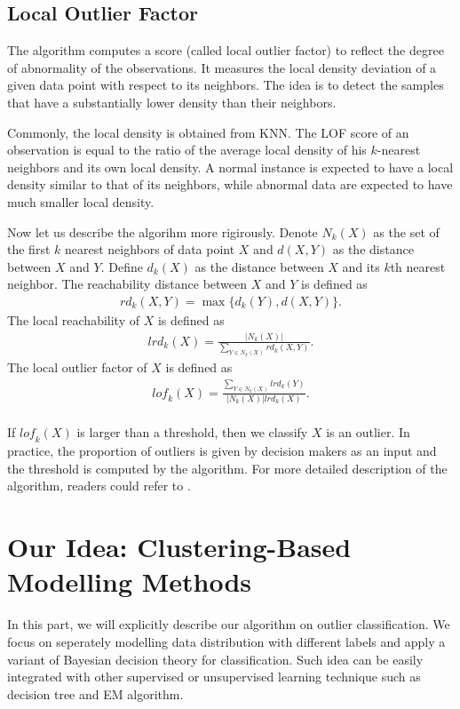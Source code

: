 \documentclass[english]{article}
\newenvironment{eqt}{\begin{equation}\begin{aligned}}{\end{aligned}\end{equation}}
\begin{document}
\subsection{Local Outlier Factor}
\par
The algorithm computes a score (called local outlier factor) to reflect the degree of abnormality of the observations. It measures the local density deviation of a given data point with respect to its neighbors. The idea is to detect the samples that have a substantially lower density than their neighbors.
\par
Commonly, the local density is obtained from KNN. The LOF score of an observation is equal to the ratio of the average local density of his $k$-nearest neighbors and its own local density. A normal instance is expected to have a local density similar to that of its neighbors, while abnormal data are expected to have much smaller local density.
\par
Now let us describe the algorihm more rigirously. Denote $N_k(X)$ as the set of the first $k$ nearest neighbors of data point $X$ and $d(X, Y)$ as the distance between $X$ and $Y$. Define $d_k(X)$ as the distance between $X$ and its $k$th nearest neighbor. The reachability distance between $X$ and $Y$ is defined as
\begin{eqt}
\textit{rd}_k(X, Y) = \max\{d_k(Y), d(X, Y)\}.
\end{eqt}
The local reachability of $X$ is defined as 
\begin{eqt}
\textit{lrd}_k(X) = \frac{|N_k(X)|}{\sum_{Y\in N_k(X)}\textit{rd}_k(X, Y)}.
\end{eqt}
The local outlier factor of $X$ is defined as 
\begin{eqt}
\textit{lof}_k(X) = \frac{\sum_{Y\in N_k(X)}\textit{lrd}_k(Y)}{|N_k(X)|\textit{lrd}_k(X)}.
\end{eqt}

\paragraph{}
If $\textit{lof}_k(X)$ is larger than a threshold, then we classify $X$ is an outlier. In practice, the proportion of outliers is given by decision makers as an input and the threshold is computed by the algorithm. For more detailed description of the algorithm, readers could refer to \cite{lof}.

\section{Our Idea: Clustering-Based Modelling Methods}
\par
In this part, we will explicitly describe our algorithm on outlier classification. We focus on seperately modelling data distribution with different labels and apply a variant of Bayesian decision theory for classification. Such idea can be easily integrated with other supervised or unsupervised learning technique such as decision tree and EM algorithm.
\end{document}
